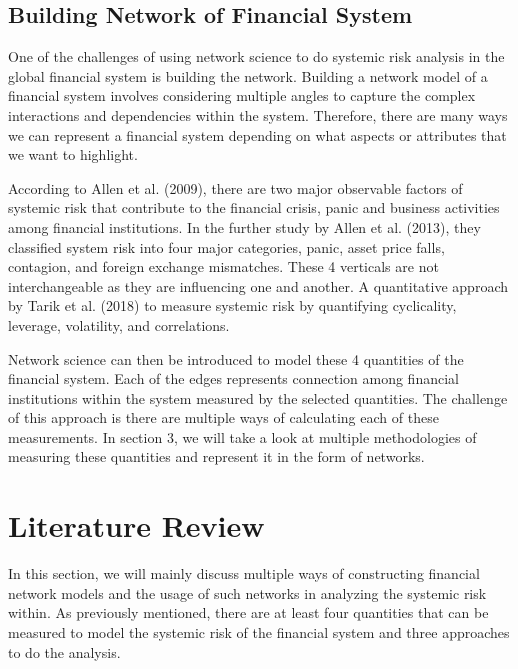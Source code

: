 \documentclass[a4paper,11pt]{article}
\begin{document}
\subsection{Building Network of Financial System}
One of the challenges of using network science to do systemic risk analysis in the global financial system is building the network. Building a network model of a financial system involves considering multiple angles to capture the complex interactions and dependencies within the system. Therefore, there are many ways we can represent a financial system depending on what aspects or attributes that we want to highlight.

According to Allen et al. (2009), there are two major observable factors of systemic risk that contribute to the financial crisis, panic and business activities among financial institutions. In the further study by Allen et al. (2013), they classified system risk into four major categories, panic, asset price falls, contagion, and foreign exchange mismatches. These 4 verticals are not interchangeable as they are influencing one and another. A quantitative approach by Tarik et al. (2018) to measure systemic risk by quantifying cyclicality, leverage, volatility, and correlations. 

Network science can then be introduced to model these 4 quantities of the financial system. Each of the edges represents connection among financial institutions within the system measured by the selected quantities. The challenge of this approach is there are multiple ways of calculating each of these measurements. In section 3, we will take a look at multiple methodologies of measuring these quantities and represent it in the form of networks.

\section{Literature Review}
In this section, we will mainly discuss multiple ways of constructing financial network models and the usage of such networks in analyzing the systemic risk within. As previously mentioned, there are at least four quantities that can be measured to model the systemic risk of the financial system and three approaches to do the analysis.
\end{document}
